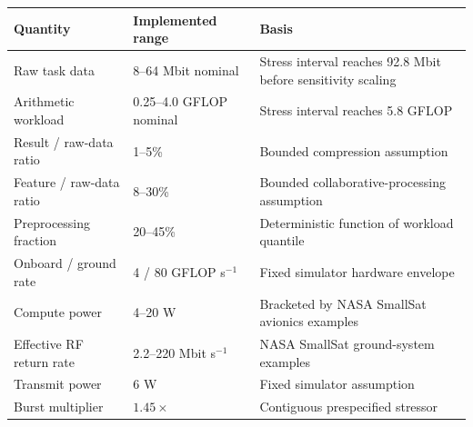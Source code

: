 \begin{tabular}{lll}
\toprule
Quantity & Implemented range & Basis \\
\midrule
Raw task data & 8--64 Mbit nominal & Stress interval reaches 92.8 Mbit before sensitivity scaling \\
Arithmetic workload & 0.25--4.0 GFLOP nominal & Stress interval reaches 5.8 GFLOP \\
Result / raw-data ratio & 1--5\% & Bounded compression assumption \\
Feature / raw-data ratio & 8--30\% & Bounded collaborative-processing assumption \\
Preprocessing fraction & 20--45\% & Deterministic function of workload quantile \\
Onboard / ground rate & 4 / 80 GFLOP s$^{-1}$ & Fixed simulator hardware envelope \\
Compute power & 4--20 W & Bracketed by NASA SmallSat avionics examples \\
Effective RF return rate & 2.2--220 Mbit s$^{-1}$ & NASA SmallSat ground-system examples \\
Transmit power & 6 W & Fixed simulator assumption \\
Burst multiplier & $1.45\times$ & Contiguous prespecified stressor \\
\bottomrule
\end{tabular}
